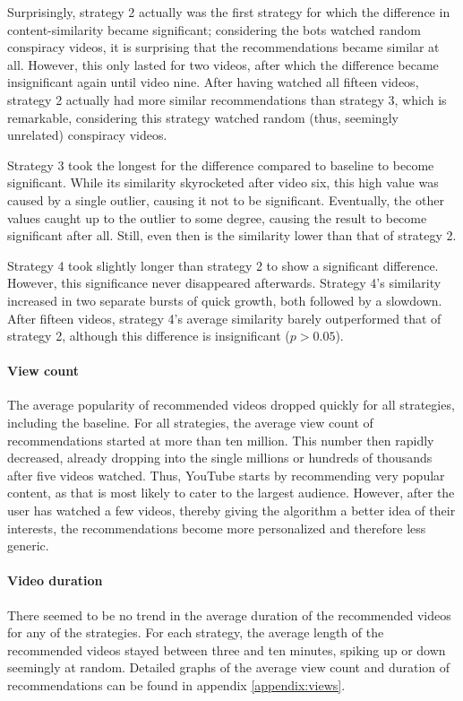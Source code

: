 \documentclass[../main.tex]{subfiles}
\begin{document}
Surprisingly, strategy 2 actually was the first strategy for which the difference in content-similarity 
became significant; considering the bots watched random conspiracy videos, it is surprising that the 
recommendations became similar at all. However, this only lasted for two videos, after which the difference 
became insignificant again until video nine. After having watched all fifteen videos, strategy 2 actually had 
more similar recommendations than strategy 3, which is remarkable, considering this strategy watched random 
(thus, seemingly unrelated) conspiracy videos. 

Strategy 3 took the longest for the difference compared to baseline to become significant. While its 
similarity skyrocketed after video six, this high value was caused by a single outlier, causing it not 
to be significant. Eventually, the other values caught up to the outlier to some degree, causing the result 
to become significant after all. Still, even then is the similarity lower than that of strategy 2. 

Strategy 4 took slightly longer than strategy 2 to show a significant difference. However, this significance 
never disappeared afterwards. Strategy 4's similarity increased in two separate bursts of quick growth, 
both followed by a slowdown. After fifteen videos, strategy 4's average similarity barely outperformed 
that of strategy 2, although this difference is insignificant ($p > 0.05$).

\paragraph{View count}
The average popularity of recommended videos dropped quickly for all strategies, including the baseline. For 
all strategies, the average view count of recommendations started at more than ten million. This number then 
rapidly decreased, already dropping into the single millions or hundreds of thousands after five videos
watched. Thus, YouTube starts by recommending very popular content, as that is most likely to cater to the 
largest audience. However, after the user has watched a few videos, thereby giving the algorithm a better
idea of their interests, the recommendations become more personalized and therefore less generic. 

\paragraph{Video duration}
There seemed to be no trend in the average duration of the recommended videos for any of the strategies. For 
each strategy, the average length of the recommended videos stayed between three and ten minutes, spiking up 
or down seemingly at random. Detailed graphs of the average view count and duration of recommendations can be
found in appendix \ref{appendix:views}.
\end{document}
